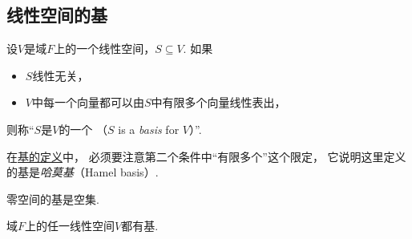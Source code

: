 \subsection{线性空间的基}
\begin{definition}\label{definition:线性空间.线性空间的基}
设\(V\)是域\(F\)上的一个线性空间，\(S \subseteq V\).
如果\begin{itemize}
	\item \(S\)线性无关，
	\item \(V\)中每一个向量都可以由\(S\)中有限多个向量线性表出，
\end{itemize}
则称“\(S\)是\(V\)的一个%
（\(S\) is a \emph{basis} for \(V\)）”.
\end{definition}
\begin{remark}
在\hyperref[definition:线性空间.线性空间的基]{基的定义}中，
必须要注意第二个条件中“有限多个”这个限定，
它说明这里定义的基是\emph{哈莫基}（Hamel basis）.
\end{remark}

\begin{property}\label{theorem:线性空间的结构.零空间的基是空集}
零空间的基是空集.
\end{property}

\begin{property}
域\(F\)上的任一线性空间\(V\)都有基.
\end{property}

